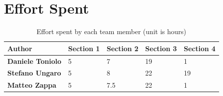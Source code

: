 \chapter{Effort Spent}
\begin{table}[H]
    \sf
    \small
    \centering
    \renewcommand{\arraystretch}{1.5}
    \begin{tabularx}{\textwidth}{|X|X|X|X|X|}
        \hline
        \rowcolor{lightgray} \textbf{Author} & \textbf{Section 1} & \textbf{Section 2} & \textbf{Section 3} & \textbf{Section 4} \\
        \hline
        \textbf{Daniele Toniolo} & 5 & 7 & 19 & 1 \\
        \textbf{Stefano Ungaro} & 5 & 8 & 22 & 19 \\
        \textbf{Matteo Zappa} & 5 & 7.5 & 22 & 1 \\
        \hline
    \end{tabularx}
    \caption{Effort spent by each team member (unit is hours)}
\end{table}